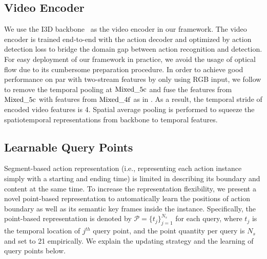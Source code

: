 \documentclass{article}
\begin{document}
\subsection{Video Encoder}
We use the I3D backbone~\cite{DBLP:conf/cvpr/CarreiraZ17} as the video encoder in our framework. The video encoder is trained end-to-end with the action decoder and optimized by action detection loss to bridge the domain gap between action recognition and detection. 
For easy deployment of our framework in practice, we avoid the usage of optical flow due to its cumbersome preparation procedure. 
In order to achieve good performance on par with two-stream features by only using RGB input, we follow \cite{DBLP:journals/corr/abs-2205-02717} to remove the temporal pooling at ${\rm Mixed \_ 5c}$ and fuse the features from ${\rm Mixed \_ 5c}$ with features from ${\rm Mixed \_ 4f}$ as in  \cite{liu2022an}. As a result, the temporal stride of encoded video features is 4. Spatial average pooling is performed to squeeze the spatiotemporal representations from backbone to temporal features.

\subsection{Learnable Query Points}
Segment-based action representation (i.e., representing each action instance simply with a starting and ending time) is limited in describing its boundary and content at the same time. To increase the representation flexibility, we present a novel point-based representation to automatically learn the positions of action boundary as well as its semantic key frames inside the instance. Specifically, the point-based representation is denoted by $\mathcal{P} = \{t_j\}_{j=1}^{N_s}$ for each query, where $t_j$ is the temporal location of $j^{th}$ query point, and the point quantity per query is $N_s$ and set to 21 empirically. 
We explain the updating strategy and the learning of query points below.
\end{document}
